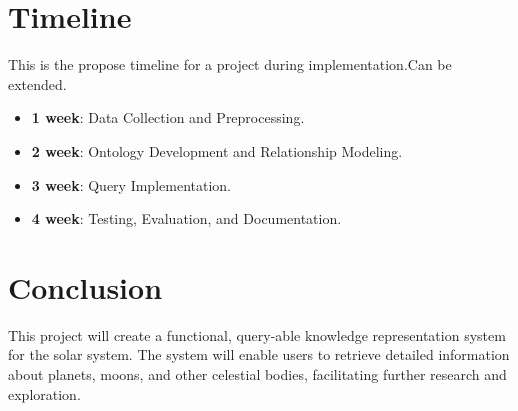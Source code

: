 \documentclass{article}
\begin{document}
\section{Timeline}
This is the propose timeline for a project during implementation.Can be extended.
\begin{itemize}
    \item \textbf{1 week}: Data Collection and Preprocessing.
    \item \textbf{2 week}: Ontology Development and Relationship Modeling.
    \item \textbf{3 week}: Query Implementation.
    \item \textbf{4 week}: Testing, Evaluation, and Documentation.
\end{itemize}

\section{Conclusion}
This project will create a functional, query-able knowledge representation system for the solar system. The system will enable users to retrieve detailed information about planets, moons, and other celestial bodies, facilitating further research and exploration.
\end{document}
